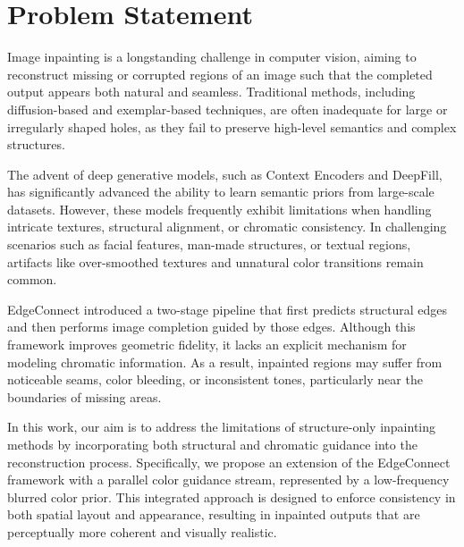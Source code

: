 \section{Problem Statement}

Image inpainting is a longstanding challenge in computer vision, aiming to reconstruct missing or corrupted regions of an image such that the completed output appears both natural and seamless. Traditional methods, including diffusion-based and exemplar-based techniques, are often inadequate for large or irregularly shaped holes, as they fail to preserve high-level semantics and complex structures.

The advent of deep generative models, such as Context Encoders and DeepFill, has significantly advanced the ability to learn semantic priors from large-scale datasets. However, these models frequently exhibit limitations when handling intricate textures, structural alignment, or chromatic consistency. In challenging scenarios such as facial features, man-made structures, or textual regions, artifacts like over-smoothed textures and unnatural color transitions remain common.

EdgeConnect introduced a two-stage pipeline that first predicts structural edges and then performs image completion guided by those edges. Although this framework improves geometric fidelity, it lacks an explicit mechanism for modeling chromatic information. As a result, inpainted regions may suffer from noticeable seams, color bleeding, or inconsistent tones, particularly near the boundaries of missing areas.

In this work, our aim is to address the limitations of structure-only inpainting methods by incorporating both structural and chromatic guidance into the reconstruction process. Specifically, we propose an extension of the EdgeConnect framework with a parallel color guidance stream, represented by a low-frequency blurred color prior. This integrated approach is designed to enforce consistency in both spatial layout and appearance, resulting in inpainted outputs that are perceptually more coherent and visually realistic.
